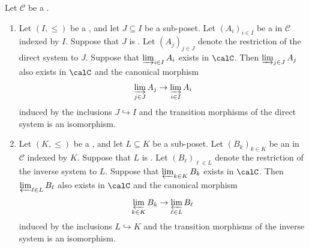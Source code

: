 \begin{theorem} \label{theorem:cofinal_final_subsystems_suffice_for_direct_inverse_limits}
Let $\mathcal{C}$ be a .
\begin{enumerate}
    \item Let $(I, \leq)$ be a , and let $J \subseteq I$ be a sub-poset. Let $(A_i)_{i \in I}$ be a  in $\mathcal{C}$ indexed by $I$. Suppose that $J$ is . Let $(A_j)_{j \in J}$ denote the restriction of the direct system to $J$. Suppose that $\varinjlim_{i \in I} A_i$ exists in $\calC$. Then $\varinjlim_{j \in J} A_j$ also exists in $\calC$ and the canonical morphism
    \begin{align} \label{eq:canonical_morphism_from_direct_limit_for_subposet_to_direct_limit_for_parent_poset}
    \varinjlim_{j \in J} A_j \to \varinjlim_{i \in I} A_i
    \end{align}
    induced by the inclusions $J \hookrightarrow I$ and the transition morphisms of the direct system is an isomorphism.

    \item Let $(K, \leq)$ be a , and let $L \subseteq K$ be a sub-poset. Let $(B_k)_{k \in K}$ be an  in $\mathcal{C}$ indexed by $K$. Suppose that $L$ is . Let $(B_\ell)_{\ell \in L}$ denote the restriction of the inverse system to $L$. Suppose that $\varprojlim_{k \in K} B_k$ exists in $\calC$. Then $\varprojlim_{\ell \in L} B_\ell$ also exists in $\calC$ and the canonical morphism
    \begin{align} \label{eq:canonical_morphism_from_inverse_limit_for_subposet_to_inverse_limit_for_parent_poset}
    \varprojlim_{k \in K} B_k \to \varprojlim_{\ell \in L} B_\ell
    \end{align}
    induced by the inclusions $L \hookrightarrow K$ and the transition morphisms of the inverse system is an isomorphism.
\end{enumerate}
\end{theorem}
